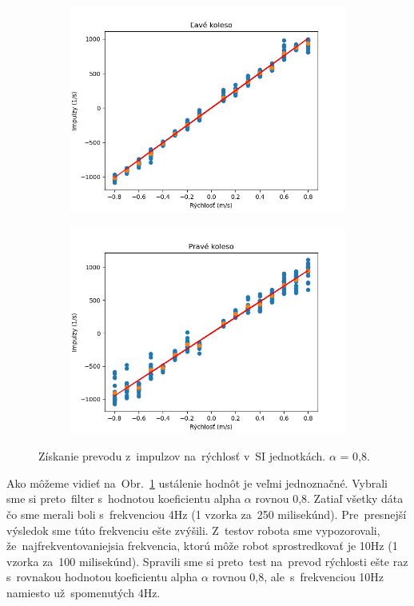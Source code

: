 \begin{figure}[!htbp]
	\begin{subfigure}{0.5\textwidth}
		\includegraphics[width=\textwidth]{img/lw_08250.png}
	\end{subfigure}
	\hfill
	\begin{subfigure}{0.5\textwidth}
		\includegraphics[width=\textwidth]{img/rw_08250.png}
	\end{subfigure}
	\caption{Získanie prevodu z~impulzov na~rýchlosť v~SI jednotkách. $\alpha$ = 0,8.}
	\label{fig:rw_lw_08250}
\end{figure}

Ako môžeme vidieť na~Obr.~\ref{fig:rw_lw_08250} ustálenie hodnôt je veľmi jednoznačné. Vybrali sme si preto~filter s~hodnotou
koeficientu alpha $\alpha$ rovnou 0,8. Zatiaľ všetky dáta čo sme merali boli s~frekvenciou 4Hz (1 vzorka za~250 milisekúnd).
Pre~presnejší výsledok sme túto frekvenciu ešte zvýšili. Z~testov robota sme vypozorovali, že~najfrekventovaniejsia frekvencia,
ktorú môže robot sprostredkovať je 10Hz (1 vzorka za~100 milisekúnd). Spravili sme si preto~test na~prevod rýchlosti ešte raz
s~rovnakou hodnotou koeficientu alpha $\alpha$ rovnou 0,8, ale~s~frekvenciou 10Hz namiesto už~spomenutých 4Hz.

